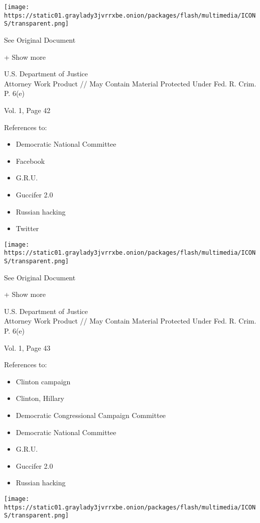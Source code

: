 \protect\hyperlink{}{}

\texttt{[image: https://static01.graylady3jvrrxbe.onion/packages/flash/multimedia/ICONS/transparent.png]}

See Original Document

+ Show more

U.S. Department of Justice\\
Attorney Work Product // May Contain Material Protected Under Fed. R.
Crim. P. 6(e)

Vol. 1, Page 42

References to:

\begin{itemize}
\tightlist
\item
  Democratic National Committee
\item
  Facebook
\item
  G.R.U.
\item
  Guccifer 2.0
\item
  Russian hacking
\item
  Twitter
\end{itemize}

\protect\hyperlink{}{}

\texttt{[image: https://static01.graylady3jvrrxbe.onion/packages/flash/multimedia/ICONS/transparent.png]}

See Original Document

+ Show more

U.S. Department of Justice\\
Attorney Work Product // May Contain Material Protected Under Fed. R.
Crim. P. 6(e)

Vol. 1, Page 43

References to:

\begin{itemize}
\tightlist
\item
  Clinton campaign
\item
  Clinton, Hillary
\item
  Democratic Congressional Campaign Committee
\item
  Democratic National Committee
\item
  G.R.U.
\item
  Guccifer 2.0
\item
  Russian hacking
\end{itemize}

\protect\hyperlink{}{}

\texttt{[image: https://static01.graylady3jvrrxbe.onion/packages/flash/multimedia/ICONS/transparent.png]}

